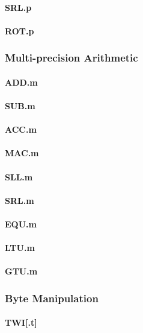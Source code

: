 \paragraph{SRL.p}
\paragraph{ROT.p}

\subsubsection{Multi-precision Arithmetic}
\paragraph{ADD.m}
\paragraph{SUB.m}
\paragraph{ACC.m}
\paragraph{MAC.m}
\paragraph{SLL.m}
\paragraph{SRL.m}
\paragraph{EQU.m}
\paragraph{LTU.m}
\paragraph{GTU.m}

\subsubsection{Byte Manipulation}
\paragraph{TWI[.t]}


